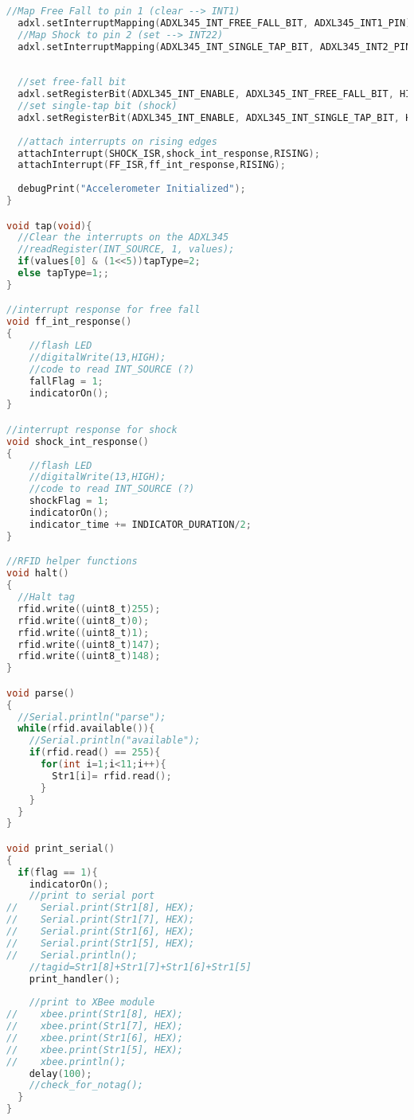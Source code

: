 \begin{lstlisting}[frame = single, language = C]
  //Map Free Fall to pin 1 (clear --> INT1)
  adxl.setInterruptMapping(ADXL345_INT_FREE_FALL_BIT, ADXL345_INT1_PIN);
  //Map Shock to pin 2 (set --> INT22)
  adxl.setInterruptMapping(ADXL345_INT_SINGLE_TAP_BIT, ADXL345_INT2_PIN);
  
  
  //set free-fall bit
  adxl.setRegisterBit(ADXL345_INT_ENABLE, ADXL345_INT_FREE_FALL_BIT, HIGH);
  //set single-tap bit (shock)
  adxl.setRegisterBit(ADXL345_INT_ENABLE, ADXL345_INT_SINGLE_TAP_BIT, HIGH);
  
  //attach interrupts on rising edges
  attachInterrupt(SHOCK_ISR,shock_int_response,RISING);
  attachInterrupt(FF_ISR,ff_int_response,RISING);
  
  debugPrint("Accelerometer Initialized");
}

void tap(void){
  //Clear the interrupts on the ADXL345
  //readRegister(INT_SOURCE, 1, values); 
  if(values[0] & (1<<5))tapType=2;
  else tapType=1;;
}

//interrupt response for free fall
void ff_int_response()
{
    //flash LED
    //digitalWrite(13,HIGH);
    //code to read INT_SOURCE (?)
    fallFlag = 1;  
    indicatorOn();
}

//interrupt response for shock
void shock_int_response()
{
    //flash LED
    //digitalWrite(13,HIGH);
    //code to read INT_SOURCE (?)
    shockFlag = 1;   
    indicatorOn();
    indicator_time += INDICATOR_DURATION/2;
}

//RFID helper functions
void halt()
{
  //Halt tag
  rfid.write((uint8_t)255);
  rfid.write((uint8_t)0);
  rfid.write((uint8_t)1);
  rfid.write((uint8_t)147);
  rfid.write((uint8_t)148);
}

void parse()
{
  //Serial.println("parse");
  while(rfid.available()){
    //Serial.println("available");
    if(rfid.read() == 255){
      for(int i=1;i<11;i++){
        Str1[i]= rfid.read();
      }
    }
  }
}

void print_serial()
{
  if(flag == 1){
    indicatorOn();
    //print to serial port
//    Serial.print(Str1[8], HEX);
//    Serial.print(Str1[7], HEX);
//    Serial.print(Str1[6], HEX);
//    Serial.print(Str1[5], HEX);
//    Serial.println();
    //tagid=Str1[8]+Str1[7]+Str1[6]+Str1[5]
    print_handler();
 
    //print to XBee module
//    xbee.print(Str1[8], HEX);
//    xbee.print(Str1[7], HEX);
//    xbee.print(Str1[6], HEX);
//    xbee.print(Str1[5], HEX);
//    xbee.println();
    delay(100);
    //check_for_notag();
  }
}


\end{lstlisting}
